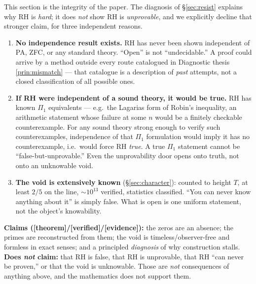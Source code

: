 \documentclass[11pt,a4paper]{article}
\theoremstyle{definition}
\newcommand{\TAGthm}{{\small\textsf{[\textcolor{green!45!black}{theorem}]}}}
\newcommand{\TAGver}{{\small\textsf{[\textcolor{blue!60!black}{verified}]}}}
\newcommand{\TAGev}{{\small\textsf{[\textcolor{orange!80!black}{evidence}]}}}
\begin{document}
This section is the integrity of the paper. The diagnosis of
\S\ref{sec:resist} explains why RH is \emph{hard}; it does \emph{not} show RH
is \emph{unprovable}, and we explicitly decline that stronger claim, for three
independent reasons.

\begin{enumerate}[label=(\arabic*),leftmargin=*]
\item \textbf{No independence result exists.} RH has never been shown
independent of PA, ZFC, or any standard theory. ``Open'' is not ``undecidable.''
A proof could arrive by a method outside every route catalogued in Diagnostic
thesis \ref{prin:mismatch} --- that catalogue is a description of \emph{past}
attempts, not a closed classification of all possible ones.
\item \textbf{If RH were independent of a sound theory, it would be true.} RH
has known $\Pi_1$ equivalents --- e.g.\ the Lagarias \cite{Lagarias} form of
Robin's inequality, an arithmetic statement whose failure at some $n$ would be
a finitely checkable counterexample. For any sound theory strong enough to
verify such counterexamples, independence of that $\Pi_1$ formulation would
imply it has no counterexample, i.e.\ would force RH \emph{true}. A true
$\Pi_1$ statement cannot be ``false-but-unprovable.'' Even the unprovability
door opens onto truth, not onto an unknowable void.
\item \textbf{The void is extensively known} (\S\ref{sec:character}): counted
to height $T$, at least $2/5$ on the line, $\sim10^{13}$ verified, statistics
classified. ``You can never know anything about it'' is simply false. What is
open is one uniform statement, not the object's knowability.
\end{enumerate}

\begin{tcolorbox}[colback=red!2,colframe=red!50!black,arc=2mm,
  title={\textbf{What this paper does and does not claim}},
  fonttitle=\bfseries,breakable]
\textbf{Claims (\TAGthm/\TAGver/\TAGev):} the zeros are an absence; the primes
are reconstructed from them; the void is timeless/observer-free and formless in
exact senses; and a principled \emph{diagnosis} of why construction stalls.\\[2pt]
\textbf{Does \emph{not} claim:} that RH is false, that RH is unprovable, that
RH ``can never be proven,'' or that the void is unknowable. Those are
\emph{not} consequences of anything above, and the mathematics does not
support them.
\end{tcolorbox}
\end{document}
